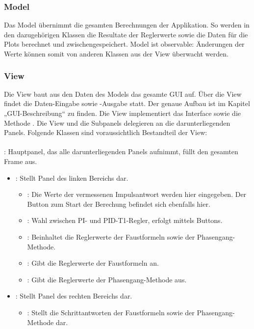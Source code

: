 \subsubsection*{Model}
Das  Model \"ubernimmt  die gesamten  Berechnungen der  Applikation. So werden
in   den  dazugeh\"origen   Klassen  die   Resultate  der   Reglerwerte  sowie
die  Daten  f\"ur  die  Plots  berechnet  und  zwischengespeichert. Model  ist
observable: \"Anderungen der Werte k\"onnen somit  von anderen Klassen aus der
View \"uberwacht werden.


\subsubsection*{View}
Die View baut  aus den Daten des  Models das gesamte GUI  auf. \"Uber die View
findet  die  Daten-Eingabe sowie  -Ausgabe  statt. Der  genaue Aufbau  ist  im
Kapitel  „GUI-Beschreibung“ zu  finden. Die View  implementiert das  Interface
 sowie die Methode  . Die View und die Subpanels
delegieren   an die darunterliegenden  Panels. Folgende Klassen
sind voraussichtlich Bestandteil der View:

\paragraph{}: Hauptpanel, das  alle darunterliegenden  Panels aufnimmt, f\"ullt
den gesamten Frame aus.

\begin{itemize}
    \item{}:
        Stellt Panel des linken Bereichs dar.
        \begin{itemize}
            \item{}:
                Die   Werte   der   vermessenen  Impulsantwort   werden   hier
                eingegeben. Der Button  zum Start der Berechung  befindet sich
                ebenfalls hier.
            \item{}:
                Wahl zwischen PI- und PID-T1-Regler, erfolgt mittels Buttons.
            \item{}:
                Beinhaltet   die  Reglerwerte   der  Faustformeln   sowie  der
                Phasengang-Methode.
            \item{}:
                Gibt die Reglerwerte der Faustformeln an.
            \item{}:
                Gibt die Reglerwerte der Phasengang-Methode aus.
        \end{itemize}
    \item{}:
        Stellt Panel des rechten Bereichs dar.
        \begin{itemize}
            \item{}:
                Stellt  die   Schrittantworten  der  Faustformeln   sowie  der
                Phasengang-Methode dar.
        \end{itemize}
\end{itemize}


